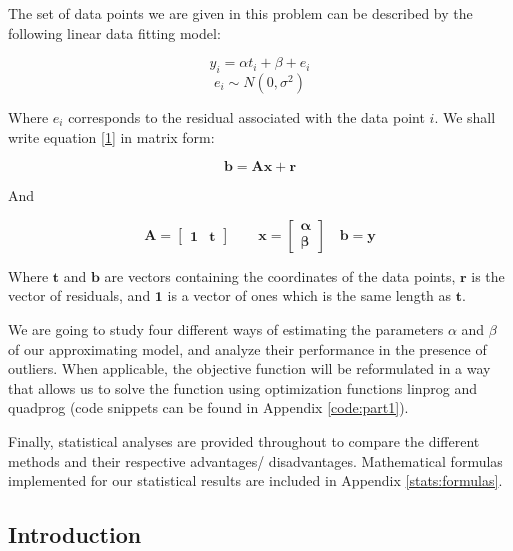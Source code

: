 The set of data points we are given in this problem can be described by the following linear data fitting model:


\begin{equation}
y_i = \alpha t_i + \beta + e_i  
\label{1}
\end{equation}
\[
e_i \sim N(0,\sigma^2)
\]

Where $e_i$ corresponds to the residual associated with the data point $i$. We shall write equation \ref{1} in matrix  form:

\begin{equation}
\mathbf{b} = \mathbf{A} \mathbf{x} + \mathbf{r}  
\end{equation}
 
And

\[
\mathbf{A} = \begin{bmatrix}
\mathbf{1} & \mathbf{t}
\end{bmatrix}
\qquad
\mathbf{x}= \begin{bmatrix}
\mathbf{\alpha} \\
\mathbf{\beta}
\end{bmatrix}
\quad \mathbf{b} = \mathbf{y}
\]

Where $\mathbf{t}$ and $\mathbf{b}$ are vectors containing the coordinates of the data points, $\mathbf{r}$ is the vector of residuals, and $\mathbf{1}$ is a vector of ones which is the same length as $\mathbf{t}$.	

We are going to study four different ways of estimating the parameters $\alpha$ and $\beta$ of our approximating model, and analyze their performance in the presence of outliers. When applicable, the objective function will be reformulated in a way that allows us to solve the function using \matlab optimization functions linprog and quadprog (code snippets can be found in Appendix \ref{code:part1}). 

Finally, statistical analyses are provided throughout to compare the different methods and their respective advantages/ disadvantages. Mathematical formulas implemented for our statistical results are included in Appendix \ref{stats:formulas}.

\subsection{Introduction}

